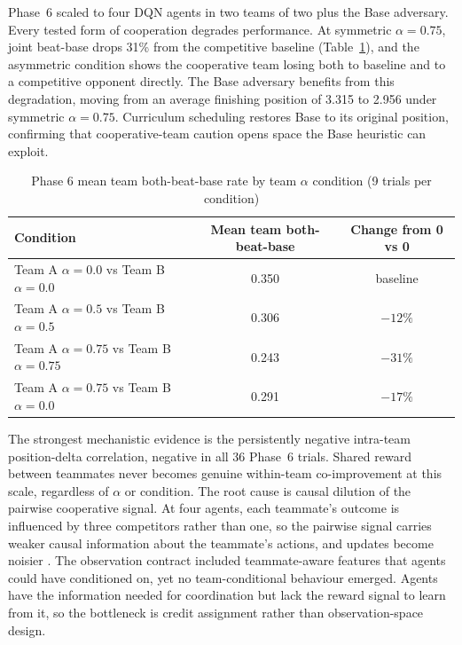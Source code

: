 Phase~6 scaled to four DQN agents in two teams of two plus the Base adversary. Every tested form of cooperation degrades performance. At symmetric $\alpha = 0.75$, joint beat-base drops 31\% from the competitive baseline (Table~\ref{tab:phase6-results}), and the asymmetric condition shows the cooperative team losing both to baseline and to a competitive opponent directly. The Base adversary benefits from this degradation, moving from an average finishing position of 3.315 to 2.956 under symmetric $\alpha = 0.75$. Curriculum scheduling restores Base to its original position, confirming that cooperative-team caution opens space the Base heuristic can exploit.

\begin{table}[htbp]
\centering
\small
\caption{Phase 6 mean team both-beat-base rate by team $\alpha$ condition (9 trials per condition)}
\label{tab:phase6-results}
\begin{tabular}{|l|c|c|}
\hline
\textbf{Condition} & \textbf{Mean team both-beat-base} & \textbf{Change from 0 vs 0} \\
\hline
Team A $\alpha=0.0$ vs Team B $\alpha=0.0$   & 0.350 & baseline \\
Team A $\alpha=0.5$ vs Team B $\alpha=0.5$   & 0.306 & $-12\%$ \\
Team A $\alpha=0.75$ vs Team B $\alpha=0.75$ & 0.243 & $-31\%$ \\
Team A $\alpha=0.75$ vs Team B $\alpha=0.0$  & 0.291 & $-17\%$ \\
\hline
\end{tabular}
\end{table}

The strongest mechanistic evidence is the persistently negative intra-team position-delta correlation, negative in all 36 Phase~6 trials. Shared reward between teammates never becomes genuine within-team co-improvement at this scale, regardless of $\alpha$ or condition. The root cause is causal dilution of the pairwise cooperative signal. At four agents, each teammate's outcome is influenced by three competitors rather than one, so the pairwise signal carries weaker causal information about the teammate's actions, and updates become noisier \citep{agogino2004unifying}. The observation contract included teammate-aware features that agents could have conditioned on, yet no team-conditional behaviour emerged. Agents have the information needed for coordination but lack the reward signal to learn from it, so the bottleneck is credit assignment rather than observation-space design.

